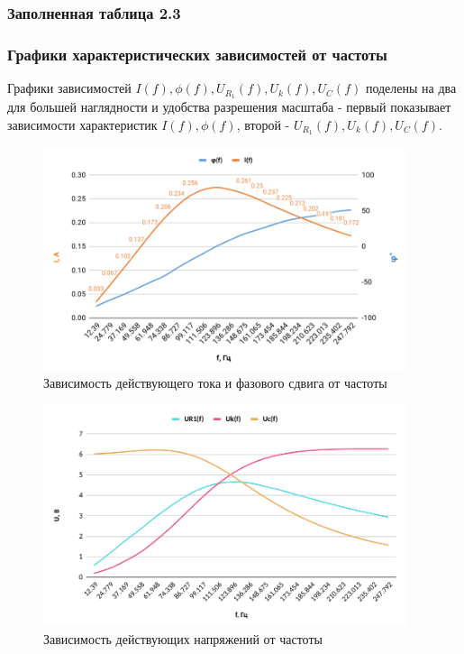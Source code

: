 \subsubsection{Заполненная таблица 2.3}


\subsubsection{Графики характеристических зависимостей от частоты}

Графики зависимостей $I(f), \phi(f), U_{R_1} (f), U_k (f), U_C (f)$ поделены на два для большей наглядности и удобства разрешения масштаба - первый показывает зависимости характеристик $I(f), \phi(f)$, второй - $U_{R_1} (f), U_k (f), U_C (f)$.

\begin{figure}[H]
	\centering
	\includegraphics[width=0.95\textwidth]{./data/graph_part2_1.png}
	\caption{Зависимость действующего тока и фазового сдвига от частоты}
\end{figure}

\begin{figure}[H]
	\centering
	\includegraphics[width=0.95\textwidth]{./data/graph_part2_2.png}
	\caption{Зависимость действующих напряжений от частоты}
\end{figure}



